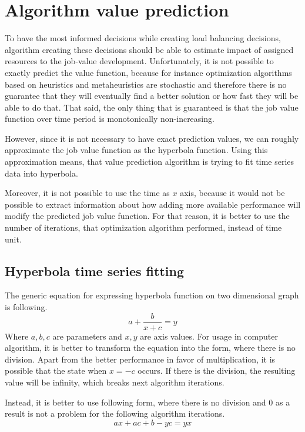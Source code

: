\section{Algorithm value prediction}\label{sec:algorithm-value-prediction}

To have the most informed decisions while creating load balancing decisions,
algorithm creating these decisions should be able to estimate impact of assigned resources to the job-value development.
Unfortunately, 
it is not possible to exactly predict the value function,
because for instance optimization algorithms based on heuristics and metaheuristics are stochastic 
and therefore there is no guarantee that they will eventually find a better solution
or how fast they will be able to do that.
That said, 
the only thing that is guaranteed is that the job value function over time period is monotonically non-increasing.

However,
since it is not necessary to have exact prediction values,
we can roughly approximate the job value function as the hyperbola function.
Using this approximation means,
that value prediction algorithm is trying to fit time series data into hyperbola.

Moreover, 
it is not possible to use the time as $x$ axis,
because it would not be possible to extract information about 
how adding more available performance will modify the predicted job value function.
For that reason,
it is better to use the number of iterations, that optimization algorithm performed,
instead of time unit.

\subsection{Hyperbola time series fitting}
The generic equation for expressing hyperbola function on two dimensional graph is following.
\begin{equation}
    a + \dfrac{b}{x+c} = y
\end{equation}
Where $a,b,c$ are parameters and $x,y$ are axis values.
For usage in computer algorithm,
it is better to transform the equation into the form, 
where there is no division.
Apart from the better performance in favor of multiplication\cite{LeFevre1999},
it is possible that the state when $x = -c$ occurs.
If there is the division,
the resulting value will be infinity,
which breaks next algorithm iterations.

Instead,
it is better to use following form, 
where there is no division and $0$ as a result is not a problem for the following algorithm iterations.
\begin{equation}\label{eq:final-hyperbola-fc}
    ax + ac + b - yc = yx
\end{equation}

